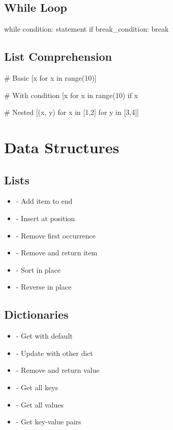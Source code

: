 \documentclass[11pt]{article}
\begin{document}
\begin{multicols}{3}
  \subsection{While Loop}
  \begin{moderncode}
while condition:
    statement
    if break_condition:
        break
  \end{moderncode}
  
  \subsection{List Comprehension}
  \begin{moderncode}
\# Basic
[x for x in range(10)]

\# With condition
[x for x in range(10) if x %

\# Nested
[(x, y) for x in [1,2] for y in [3,4]]
  \end{moderncode}
\end{multicols}

\section{Data Structures}

\begin{multicols}{3}
  \subsection{Lists}
  \begin{itemize}
    \item {} - Add item to end
    \item {} - Insert at position
    \item {} - Remove first occurrence
    \item {} - Remove and return item
    \item {} - Sort in place
    \item {} - Reverse in place
  \end{itemize}
  
  \subsection{Dictionaries}
  \begin{itemize}
    \item {} - Get with default
    \item {} - Update with other dict
    \item {} - Remove and return value
    \item {} - Get all keys
    \item {} - Get all values
    \item {} - Get key-value pairs
  \end{itemize}
\end{multicols}
\end{document}
